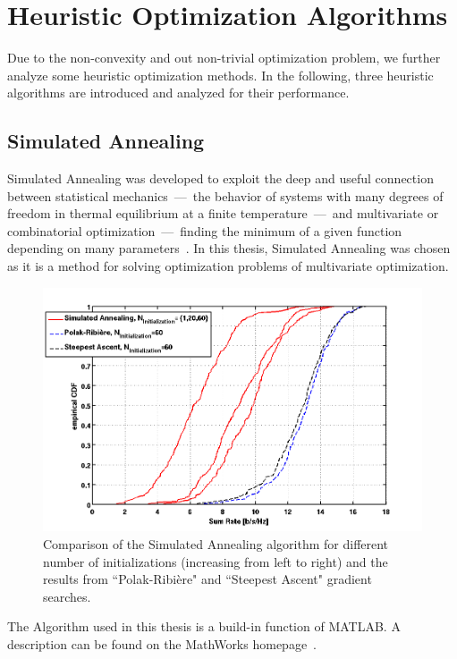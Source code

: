 \section{Heuristic Optimization Algorithms}
\label{sec:heuristic}
Due to the non-convexity and out non-trivial optimization problem, we further analyze some heuristic optimization methods.
In the following, three heuristic algorithms are introduced and analyzed for their performance.

\subsection{Simulated Annealing}
\label{sec:sim_annealing}
Simulated Annealing was developed to exploit the deep and useful connection between statistical mechanics~---~the behavior of systems with many degrees of freedom in thermal equilibrium at a finite temperature~---~and multivariate or combinatorial optimization~---~finding the minimum of a given function depending on many parameters~\cite{Kirkpatrick83}.
In this thesis, Simulated Annealing was chosen as it is a method for solving optimization problems of multivariate optimization.
\begin{figure}[h]
\centering
  \includegraphics[width=\linewidth]{images/Simannealcomparison.png}
\caption{Comparison of the Simulated Annealing algorithm for different number of initializations (increasing from left to right) and the results from ``Polak-Ribi\`{e}re" and ``Steepest Ascent" gradient searches.}
\label{fig:heur_sa}
\end{figure}
The Algorithm used in this thesis is a build-in function of MATLAB.
A description can be found on the MathWorks homepage~\cite{matlab:simulann}.
 
